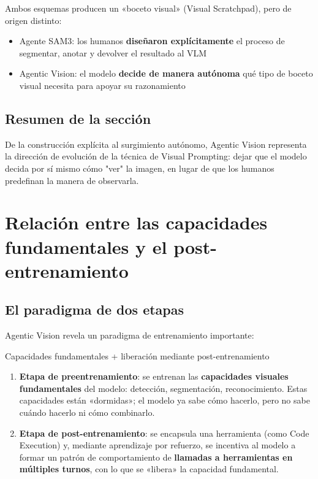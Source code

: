 \documentclass[a4paper]{article}
\begin{document}
Ambos esquemas producen un «boceto visual» (Visual Scratchpad), pero de origen distinto:

\begin{itemize}
    \item Agente SAM3: los humanos \textbf{diseñaron explícitamente} el proceso de segmentar, anotar y devolver el resultado al VLM
    \item Agentic Vision: el modelo \textbf{decide de manera autónoma} qué tipo de boceto visual necesita para apoyar su razonamiento
\end{itemize}

\subsection{Resumen de la sección}

De la construcción explícita al surgimiento autónomo, Agentic Vision representa la dirección de evolución de la técnica de Visual Prompting: dejar que el modelo decida por sí mismo cómo "ver" la imagen, en lugar de que los humanos predefinan la manera de observarla.

\section{Relación entre las capacidades fundamentales y el post-entrenamiento}

\subsection{El paradigma de dos etapas}

Agentic Vision revela un paradigma de entrenamiento importante:

\begin{importantbox}{Capacidades fundamentales + liberación mediante post-entrenamiento}
\begin{enumerate}
    \item \textbf{Etapa de preentrenamiento}: se entrenan las \textbf{capacidades visuales fundamentales} del modelo: detección, segmentación, reconocimiento. Estas capacidades están «dormidas»; el modelo ya sabe cómo hacerlo, pero no sabe cuándo hacerlo ni cómo combinarlo.
    \item \textbf{Etapa de post-entrenamiento}: se encapsula una herramienta (como Code Execution) y, mediante aprendizaje por refuerzo, se incentiva al modelo a formar un patrón de comportamiento de \textbf{llamadas a herramientas en múltiples turnos}, con lo que se «libera» la capacidad fundamental.
\end{enumerate}
\end{importantbox}
\end{document}

